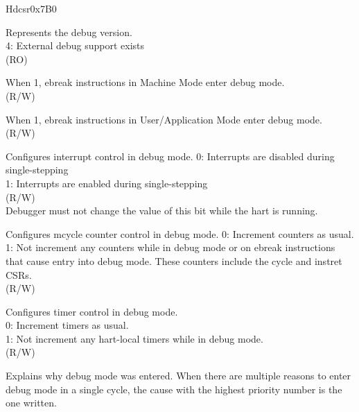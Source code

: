 
\begin{register}{H}{dcsr}{0x7B0}
\label{regdesc:DCSR}
%
%
%
%
%
%
%
%
%
%
%
%
%
%
\regnewline%
\begin{regdesc}
\begin{reglist}
\label{fielddesc:DCSRXEDBGVER}\item [xdebugver] Represents the debug version. \\
4: External debug support exists\\
(RO)
\label{fielddesc:DCSREBREAKM}\item [ebreakm] When 1, ebreak instructions in Machine Mode enter debug mode. \\
(R/W)
\label{fielddesc:DCSREBREAKU}\item [ebreaku] When 1, ebreak instructions in User/Application Mode enter debug mode. \\
(R/W)
\label{fielddesc:DCSRSTEPIE}\item [stepie] Configures interrupt control in debug mode.
0: Interrupts are disabled during single-stepping \\
1: Interrupts are enabled during single-stepping \\
(R/W) \\
Debugger must not change the value of this bit while the hart is running.
\label{fielddesc:DCSRSTOPCOUNT}\item [stopcount] Configures mcycle counter control in debug mode.
0: Increment counters as usual.\\
1: Not increment any counters while in debug mode or on ebreak instructions that cause entry into debug mode. These counters include the cycle and instret CSRs. \\
(R/W)
\label{fielddesc:DCSRSTOPTIME}\item [stoptime] Configures timer control in debug mode.\\
0: Increment timers as usual.\\
1: Not increment any hart-local timers while in debug mode. \\
(R/W)
\label{fielddesc:DCSRCAUSE}\item [cause] Explains why debug mode was entered. When there are multiple reasons to enter debug mode in a single cycle, the cause with the highest priority number is the one written.\\

\end{reglist}
\end{regdesc}
\end{register}
